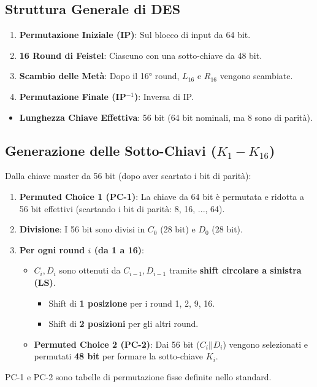 \subsection{Struttura Generale di DES}
\begin{enumerate}
    \item \textbf{Permutazione Iniziale (IP)}: Sul blocco di input da 64 bit.
    \item \textbf{16 Round di Feistel}: Ciascuno con una sotto-chiave da 48 bit.
    \item \textbf{Scambio delle Metà}: Dopo il 16° round, $L_{16}$ e $R_{16}$ vengono scambiate.
    \item \textbf{Permutazione Finale (IP$^{-1}$)}: Inversa di IP.
\end{enumerate}
\begin{itemize}
    \item \textbf{Lunghezza Chiave Effettiva}: 56 bit (64 bit nominali, ma 8 sono di parità).
\end{itemize}

\subsection{Generazione delle Sotto-Chiavi ($K_1 - K_{16}$)}
Dalla chiave master da 56 bit (dopo aver scartato i bit di parità):
\begin{enumerate}
    \item \textbf{Permuted Choice 1 (PC-1)}: La chiave da 64 bit è permutata e ridotta a 56 bit effettivi (scartando i bit di parità: 8, 16, ..., 64).
    \item \textbf{Divisione}: I 56 bit sono divisi in $C_0$ (28 bit) e $D_0$ (28 bit).
    \item \textbf{Per ogni round $i$ (da 1 a 16)}:
    \begin{itemize}
        \item $C_i, D_i$ sono ottenuti da $C_{i-1}, D_{i-1}$ tramite \textbf{shift circolare a sinistra (LS)}.
        \begin{itemize}
            \item Shift di \textbf{1 posizione} per i round 1, 2, 9, 16.
            \item Shift di \textbf{2 posizioni} per gli altri round.
        \end{itemize}
        \item \textbf{Permuted Choice 2 (PC-2)}: Dai 56 bit ($C_i || D_i$) vengono selezionati e permutati \textbf{48 bit} per formare la sotto-chiave $K_i$.
    \end{itemize}
\end{enumerate}
PC-1 e PC-2 sono tabelle di permutazione fisse definite nello standard.


